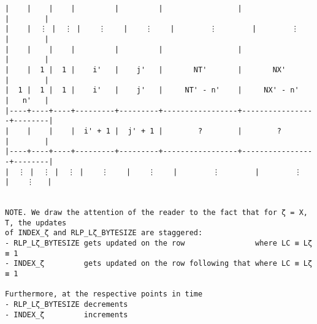\documentclass[varwidth=\maxdimen,margin=0.5cm,multi={verbatim}]{standalone}
\begin{document}
\begin{verbatim}
|    |    |    |         |         |                 |                 |        |
|    |  ⋮ |  ⋮ |    ⋮    |    ⋮    |        ⋮        |        ⋮        |        |
|    |    |    |         |         |                 |                 |        |
|    |  1 |  1 |    i'   |    j'   |       NT'       |       NX'       |        |
|  1 |  1 |  1 |    i'   |    j'   |     NT' - n'    |     NX' - n'    |   n'   |
|----+----+----+---------+---------+-----------------+-----------------+--------|
|    |    |    |  i' + 1 |  j' + 1 |        ?        |        ?        |        |
|----+----+----+---------+---------+-----------------+-----------------+--------|
|  ⋮ |  ⋮ |  ⋮ |    ⋮    |    ⋮    |        ⋮        |        ⋮        |    ⋮   |


NOTE. We draw the attention of the reader to the fact that for ζ = X, T, the updates
of INDEX_ζ and RLP_Lζ_BYTESIZE are staggered:
- RLP_Lζ_BYTESIZE gets updated on the row                where LC ≡ Lζ ≡ 1
- INDEX_ζ         gets updated on the row following that where LC ≡ Lζ ≡ 1

Furthermore, at the respective points in time
- RLP_Lζ_BYTESIZE decrements
- INDEX_ζ         increments

\end{verbatim}
\end{document}
